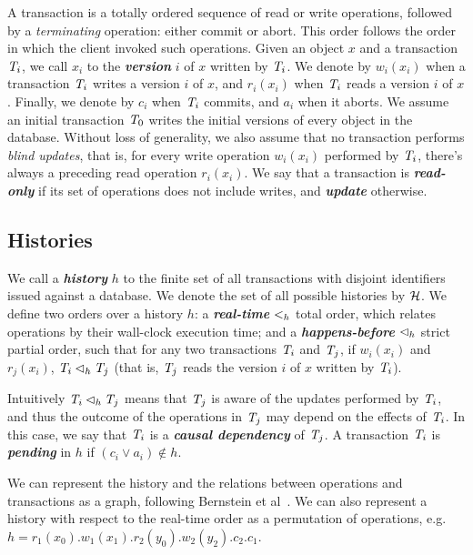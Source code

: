 A transaction is a totally ordered sequence of read or write operations, followed by a \emph{terminating} operation: either commit or abort. This order follows the order in which the client invoked such operations. Given an object $x$ and a transaction $\mathit{T}_i$, we call $x_i$ to the \textbf{\em version} $i$ of $x$ written by $\mathit{T}_i$. We denote by $w_i(x_i)$ when a transaction $\mathit{T}_i$ writes a version $i$ of $x$, and $r_i(x_i)$ when $\mathit{T}_i$ reads a version $i$ of $x$. Finally, we denote by $c_i$ when $\mathit{T}_i$ commits, and $a_i$ when it aborts. We assume an initial transaction $\mathit{T}_0$ writes the initial versions of every object in the database. Without loss of generality, we also assume that no transaction performs \emph{blind updates}, that is, for every write operation $w_i(x_i)$ performed by $\mathit{T}_i$, there's always a preceding read operation $r_i(x_i)$. We say that a transaction is \textbf{\em read-only} if its set of operations does not include writes, and \textbf{\em update} otherwise.

\subsection{Histories}
\label{sect:histories}

We call a \textbf{\em history} $h$ to the finite set of all transactions with disjoint identifiers issued against a database. We denote the set of all possible histories by $\mathcal{H}$. We define two orders over a history $h$: a \textbf{\em real-time} $<_h$ total order, which relates operations by their wall-clock execution time; and a \textbf{\em happens-before} $\lhd_h$ strict partial order, such that for any two transactions $\mathit{T}_i$ and $\mathit{T}_j$, if $w_i(x_i)$ and $r_j(x_i)$, $\mathit{T}_i \lhd_h \mathit{T}_j$ (that is, $\mathit{T}_j$ reads the version $i$ of $x$ written by $\mathit{T}_i$).

Intuitively $\mathit{T}_i \lhd_h \mathit{T}_j$ means that $\mathit{T}_j$ is aware of the updates performed by $\mathit{T}_i$, and thus the outcome of the operations in $\mathit{T}_j$ may depend on the effects of $\mathit{T}_i$. In this case, we say that $\mathit{T}_i$ is a \textbf{\em causal dependency} of $\mathit{T}_j$. A transaction $\mathit{T}_i$ is \textbf{\em pending} in $h$ if $(c_i \vee a_i) \notin h$.

We can represent the history and the relations between operations and transactions as a graph, following Bernstein et al~\citep{bernstein_concurrency}. We can also represent a history with respect to the real-time order as a permutation of operations, e.g. $h=r_1(x_0).w_1(x_1).r_2(y_0).w_2(y_2).c_2.c_1$.


